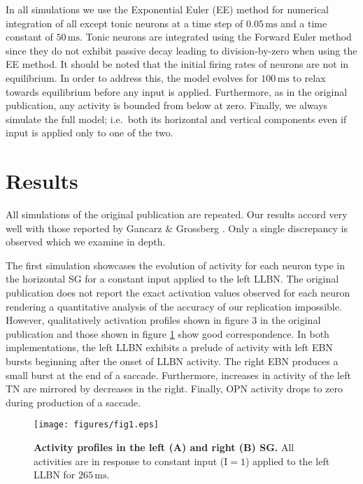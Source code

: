 \documentclass[10pt,a4paper,onecolumn]{article}
\renewcommand{\includegraphics}[2][]{\OldIncludegraphics[width=12cm, #1]{#2}}
\begin{document}
In all simulations we use the Exponential Euler (EE) method for
numerical integration of all except tonic neurons \autocite{Hahne2017}
at a time step of \(0.05\,\mathrm{ms}\) and a time constant of
\(50\,\mathrm{ms}\). Tonic neurons are integrated using the Forward
Euler method since they do not exhibit passive decay leading to
division-by-zero when using the EE method. It should be noted that the
initial firing rates of neurons are not in equilibrium. In order to
address this, the model evolves for \(100\,\mathrm{ms}\) to relax
towards equilibrium before any input is applied. Furthermore, as in the
original publication, any activity is bounded from below at zero.
Finally, we always simulate the full model; i.e.~both its horizontal and
vertical components even if input is applied only to one of the two.

\hypertarget{results}{%
\section{Results}\label{results}}

All simulations of the original publication are repeated. Our results
accord very well with those reported by Gancarz \& Grossberg
\autocite{Gancarz1998}. Only a single discrepancy is observed which we
examine in depth.

The first simulation showcases the evolution of activity for each neuron
type in the horizontal SG for a constant input applied to the left LLBN.
The original publication does not report the exact activation values
observed for each neuron rendering a quantitative analysis of the
accuracy of our replication impossible. However, qualitatively
activation profiles shown in figure 3 in the original publication and
those shown in figure \ref{fig:fig_1} show good correspondence. In both
implementations, the left LLBN exhibits a prelude of activity with left
EBN bursts beginning after the onset of LLBN activity. The right EBN
produces a small burst at the end of a saccade. Furthermore, increases
in activity of the left TN are mirrored by decreases in the right.
Finally, OPN activity drops to zero during production of a saccade.

\begin{figure}
\centering
\texttt{[image: figures/fig1.eps]}
\caption{\textbf{Activity profiles in the left (A) and right (B) SG.}
All activities are in response to constant input (\(\mathrm{I=1}\))
applied to the left LLBN for \(265\,\mathrm{ms}\).\label{fig:fig_1}}
\end{figure}
\end{document}
